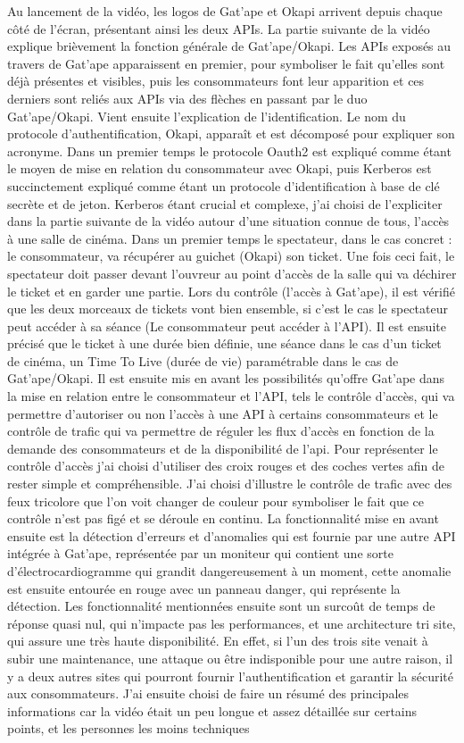 Au lancement de la vidéo, les logos de Gat'ape et Okapi arrivent depuis chaque côté de l'écran, présentant ainsi les deux APIs. La partie suivante de la vidéo explique brièvement la fonction générale de Gat'ape/Okapi. Les APIs exposés au travers de Gat'ape apparaissent en premier, pour symboliser le fait qu'elles sont déjà présentes et visibles, puis les consommateurs font leur apparition et ces derniers sont reliés aux APIs via des flèches en passant par le duo Gat'ape/Okapi. Vient ensuite l'explication de l'identification. Le nom du protocole d'authentification, Okapi, apparaît et est décomposé pour expliquer son acronyme. Dans un premier temps le protocole Oauth2 est expliqué comme étant le moyen de mise en relation du consommateur avec Okapi,  puis Kerberos est succinctement expliqué comme étant un protocole d'identification à base de clé secrète et de jeton. Kerberos étant crucial et complexe, j'ai choisi de l'expliciter dans la partie suivante de la vidéo autour d'une situation connue de tous, l'accès à une salle de cinéma. Dans un premier temps le spectateur, dans le cas concret : le consommateur, va récupérer au guichet (Okapi) son ticket. Une fois ceci fait, le spectateur doit passer devant l'ouvreur au point d'accès de la salle qui va déchirer le ticket et en garder une partie. Lors du contrôle (l'accès à Gat'ape), il est vérifié que les deux morceaux de tickets vont bien ensemble, si c'est le cas le spectateur peut accéder à sa séance (Le consommateur peut accéder à l'API). Il est ensuite précisé que le ticket à une durée bien définie, une séance dans le cas d'un ticket de cinéma, un Time To Live (durée de vie) paramétrable dans le cas de Gat'ape/Okapi. Il est ensuite mis en avant les possibilités qu'offre Gat'ape dans la mise en relation entre le consommateur et l'API, tels le contrôle d'accès, qui va permettre d'autoriser ou non l'accès à une API à certains consommateurs et le contrôle de trafic qui va permettre de réguler les flux d'accès en fonction de la demande des consommateurs et de la disponibilité de l'api. Pour représenter le contrôle d'accès j'ai choisi d'utiliser des croix rouges et des coches vertes afin de rester simple et compréhensible. J'ai choisi d'illustre le contrôle de trafic avec des feux tricolore que l'on voit changer de couleur pour symboliser le fait que ce contrôle n'est pas figé et se déroule en continu. La fonctionnalité mise en avant ensuite est la détection d'erreurs et d'anomalies qui est fournie par une autre API intégrée à Gat'ape, représentée par un moniteur qui contient une sorte d'électrocardiogramme qui grandit dangereusement à un moment, cette anomalie est ensuite entourée en rouge avec un panneau danger, qui représente la détection. Les fonctionnalité mentionnées ensuite sont un surcoût de temps de réponse quasi nul, qui n'impacte pas les performances, et une architecture tri site, qui assure  une très haute disponibilité. En effet, si l'un des trois site venait à subir une maintenance, une attaque ou être indisponible pour une autre raison, il y a deux autres sites qui pourront fournir l'authentification et garantir la sécurité aux consommateurs. J'ai ensuite choisi de faire un résumé des principales informations car la vidéo était un peu longue et assez détaillée sur certains points, et les personnes les moins techniques 